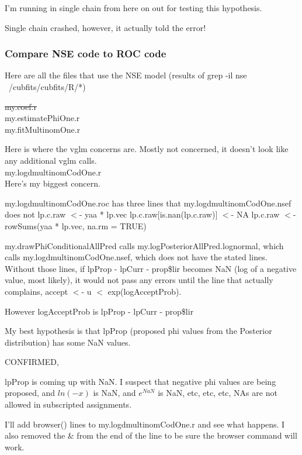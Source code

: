 I'm running in single chain from here on out for testing this hypothesis.

Single chain crashed, however, it actually told the error!



\subsubsection{Compare NSE code to ROC code}

Here are all the files that use the NSE model (results of grep -il nse ~/cubfits/cubfits/R/*)


\sout{my.coef.r}\\

my.estimatePhiOne.r\\
my.fitMultinomOne.r

Here is where the vglm concerns are. Mostly not concerned, it doesn't look like any additional vglm calls.\\


my.logdmultinomCodOne.r\\

Here's my biggest concern. 


my.logdmultinomCodOne.roc has three lines that my.logdmultinomCodOne.nsef does not
  lp.c.raw $<$- yaa * lp.vec
  lp.c.raw[is.nan(lp.c.raw)] $<$- NA
  lp.c.raw $<$- rowSums(yaa * lp.vec, na.rm = TRUE)

my.drawPhiConditionalAllPred calls my.logPosteriorAllPred.lognormal, which calls my.logdmultinomCodOne.nsef, which does not have the stated lines. Without those lines, if lpProp - lpCurr - prop\$lir becomes NaN (log of a negative value, most likely), it would not pass any errors until the line that actually complains, accept $<$- u $<$ exp(logAcceptProb).

However logAcceptProb is lpProp - lpCurr - prop\$lir

My best hypothesis is that lpProp (proposed phi values from the Posterior distribution) has some NaN values.


CONFIRMED, 



lpProp is coming up with NaN. I suspect that negative phi values are being proposed, and $ln(-x)$ is NaN, and $e^{NaN}$ is NaN, etc, etc, etc, NAs are not allowed in subscripted assignments.

I'll add browser() lines to my.logdmultinomCodOne.r and see what happens. I also removed the \& from the end of the line to be sure the browser command will work.


